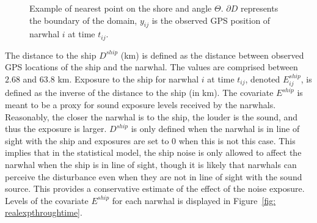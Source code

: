 \documentclass[aoas]{imsart}
\theoremstyle{definition}
\theoremstyle{remark}
\theoremstyle{remark}
\newcommand {\1}{\mathbb{1}}
\begin{document}
\begin{figure}[ht!]
	\centering
	\caption{Example of nearest point on the shore and angle $\Theta$. $\partial D$ represents the boundary of the domain, $y_{ij}$ is the observed GPS position of narwhal $i$ at time $t_{ij}$.}
	\label{fig: illustration nearest shore points}
\end{figure}

The distance to the ship $D^{ship}$ (km) is defined as the distance between observed GPS locations of the ship and the narwhal. The values are comprised between $2.68$ and $63.8$ km.
Exposure to the ship for narwhal $i$ at time $t_{ij}$, denoted $E^{ship}_{ij}$, is defined as the inverse of the distance to the ship (in km). The covariate $E^{ship}$ is meant to be a proxy for sound exposure levels received by the narwhals. Reasonably, the closer the narwhal is to the ship, the louder is the sound, and thus the exposure is larger. 
$D^{ship}$ is only defined when the narwhal is in line of sight with the ship and exposures are set to $0$ when this is not this case. This implies that in the statistical model, the ship noise is only allowed to affect the narwhal when the ship is in line of sight, though it is likely that narwhals can perceive the disturbance even when they are not in line of sight with the sound source. This provides a conservative estimate of the effect of the noise exposure. Levels of the covariate $E^{ship}$ for each narwhal is displayed in Figure~\ref{fig: realexpthroughtime}.
\end{document}
